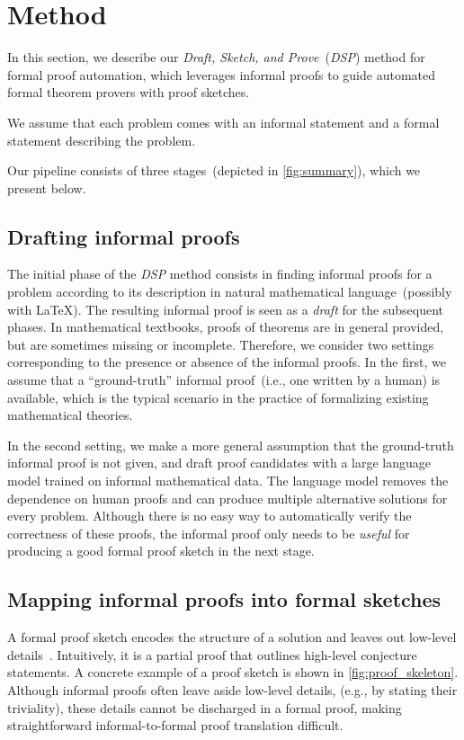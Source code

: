 \section{Method}
\label{sec:method}

In this section, we describe our \textit{Draft, Sketch, and Prove}~(\textit{DSP}) method for formal proof automation, which leverages informal proofs to guide automated formal theorem provers with proof sketches.

We assume that each problem comes with an informal statement and a formal statement describing the problem.

Our pipeline consists of three stages~(depicted in \autoref{fig:summary}), which we present below.

\subsection{Drafting informal proofs} The initial phase of the \textit{DSP} method consists in finding informal proofs for a problem according to its description in natural mathematical language~(possibly with \LaTeX). The resulting informal proof is seen as a \textit{draft} for the subsequent phases. In mathematical textbooks, proofs of theorems are in general provided, but are sometimes missing or incomplete. Therefore, we consider two settings corresponding to the presence or absence of the informal proofs. In the first, we assume that a ``ground-truth'' informal proof~(i.e., one written by a human) is available, which is the typical scenario in the practice of formalizing existing mathematical theories.

In the second setting, we make a more general assumption that the ground-truth informal proof is not given, and draft proof candidates with a large language model trained on informal mathematical data. The language model removes the dependence on human proofs and can produce multiple alternative solutions for every problem. Although there is no easy way to automatically verify the correctness of these proofs, the informal proof only needs to be \textit{useful} for producing a good formal proof sketch in the next stage.

\subsection{Mapping informal proofs into formal sketches} A formal proof sketch encodes the structure of a solution and leaves out low-level details~\citep{wiedijk2003formal}. Intuitively, it is a partial proof that outlines high-level conjecture statements. A concrete example of a proof sketch is shown in \autoref{fig:proof_skeleton}.
Although informal proofs often leave aside low-level details, (e.g., by stating their triviality), these details cannot be discharged in a formal proof, making straightforward informal-to-formal proof translation difficult.

